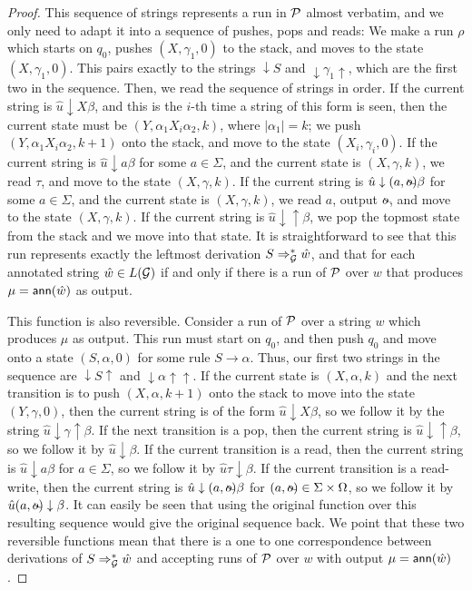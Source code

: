 \begin{proof}
This sequence of strings represents a run in $\mathcal{P}$ almost verbatim, and we only need to adapt it into a sequence of pushes, pops and reads: We make a run $\rho$ which starts on $q_0$, pushes $(X, \gamma_1, 0)$ to the stack, and moves to the state $(X, \gamma_1, 0)$. This pairs exactly to the strings $\downarrow S$ and $
\downarrow \gamma_1\uparrow$, which are the first two in the sequence. Then, we read the sequence of strings in order. If the current string is $\hat{u}\downarrow X\beta$, and this is the $i$-th time a string of this form is seen, then the current state must be $(Y, \alpha_1 X_i \alpha_2, k)$, where $|\alpha_1| = k$; we push $(Y, \alpha_1 X_i \alpha_2, k+1)$ onto the stack, and move to the state $(X_i, \gamma_i, 0)$. If the current string is $\hat{u}\downarrow a \beta$ for some $a\in \Sigma$, and the current state is $(X, \gamma, k)$, we read $\tau$, and move to the state $(X, \gamma, k)$. If the current string is $\hat{u}\downarrow (a, \oout) \beta$ for some $a\in \Sigma$, and the current state is $(X, \gamma, k)$, we read $a$, output $\oout$, and move to the state $(X, \gamma, k)$. If the current string is $\hat{u}\downarrow\uparrow\beta$, we pop the topmost state from the stack 
  and we move into that state. It is straightforward to see that this run represents exactly the leftmost derivation $S\Rightarrow_{\mathcal{G}}^* \hat{w}$, and that for each annotated string $\hat{w}\in L(\mathcal{G})$ if and only if there is a run of $\mathcal{P}$ over $w$ that produces $\mu = \textsf{ann}(\hat{w})$ as output.

This function is also reversible. Consider a run of $\mathcal{P}$ over a string $w$ which produces $\mu$ as output. This run must start on $q_0$, and then push $q_0$ and move onto a state $(S, \alpha, 0)$ for some rule $S \to \alpha$. Thus, our first two strings in the sequence are $\downarrow S\uparrow$ and $\downarrow \alpha\uparrow\uparrow$. If the current state is $(X, \alpha, k)$ and the next transition is to push $(X, \alpha, k+1)$ onto the stack to move into the state $(Y, \gamma, 0)$, then the current string is of the form $\hat{u}\downarrow X \beta$, so we follow it by the string $\hat{u}\downarrow \gamma\uparrow\beta$. If the next transition is a pop, then the current string is $\hat{u}\downarrow\uparrow\beta$, so we follow it by $\hat{u}\downarrow\beta$. If the current transition is a read, then the current string is $\hat{u}\downarrow a\beta$ for $a\in\Sigma$, so we follow it by $\hat{u}\tau\downarrow\beta$. If the current transition is a read-write, then the current string is $\hat{u}\downarrow (a, \oout)\beta$ for $(a, \oout)\in \Sigma\times\Omega$, so we follow it by $\hat{u}(a, \oout)\downarrow\beta$. It can easily be seen that using the original function over this resulting sequence would give the original sequence back. We point that these two reversible functions mean that there is a one to one correspondence between derivations of $S\Rightarrow_{\mathcal{G}}^* \hat{w}$ and accepting runs of $\mathcal{P}$ over $w$ with output $\mu = \textsf{ann}(\hat{w})$.


\end{proof}
